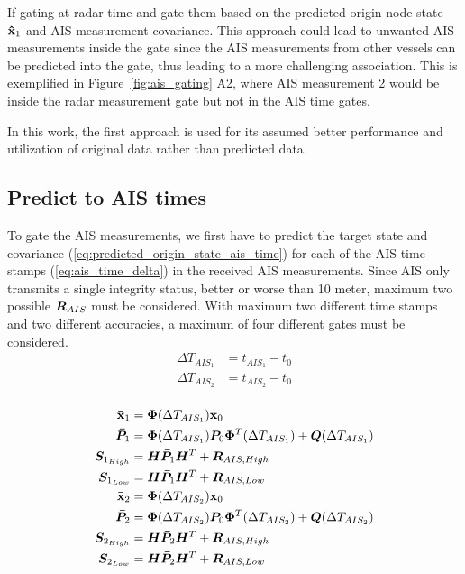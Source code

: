 If gating at radar time and gate them based on the predicted origin node state \(\boldsymbol{\mathbf{\hat{x}}}_1\) and AIS measurement covariance. This approach could lead to unwanted AIS measurements inside the gate since the AIS measurements from other vessels can be predicted into the gate, thus leading to a more challenging association. This is exemplified in Figure~\ref{fig:ais_gating} A2, where AIS measurement 2 would be inside the radar measurement gate but not in the AIS time gates.

In this work, the first approach is used for its assumed better performance and utilization of original data rather than predicted data. 

\subsection{Predict to AIS times}
To gate the AIS measurements, we first have to predict the target state and covariance (\ref{eq:predicted_origin_state_ais_time}) for each of the AIS time stamps (\ref{eq:ais_time_delta}) in the received AIS measurements. Since AIS only transmits a single integrity status, better or worse than 10 meter, maximum two possible \(\bm{R}_{AIS}\) must be considered. With maximum two different time stamps and two different accuracies, a maximum of four different gates must be considered.
\begin{equation}\label{eq:ais_time_delta}
\begin{split}
\Delta T_{AIS_1} &= t_{AIS_1} - t_{0} \\
\Delta T_{AIS_2} &= t_{AIS_2} - t_{0} \\
\end{split}
\end{equation}

\begin{equation}\label{eq:predicted_origin_state_ais_time}
\begin{split}
\boldsymbol{\mathbf{\bar{x}}}_1 	&= \bm{\Phi}(\Delta T_{AIS_1}) \boldsymbol{\mathbf{x}}_0 \\
\bm{\bar{P}}_1	&= \bm{\Phi}(\Delta T_{AIS_1}) \bm{P}_0 \bm{\Phi}^T(\Delta T_{AIS_1}) + \bm{Q}(\Delta T_{AIS_1}) \\
\bm{S}_{1_{High}}&= \bm{H} \bm{\bar{P}}_1 \bm{H}^T + \bm{R}_{AIS, High} \\
\bm{S}_{1_{Low}}	&= \bm{H} \bm{\bar{P}}_1 \bm{H}^T + \bm{R}_{AIS, Low} \\
\boldsymbol{\mathbf{\bar{x}}}_2 	&= \bm{\Phi}(\Delta T_{AIS_2}) \boldsymbol{\mathbf{x}}_0 \\
\bm{\bar{P}}_2	&= \bm{\Phi}(\Delta T_{AIS_2}) \bm{P}_0 \bm{\Phi}^T(\Delta T_{AIS_2}) + \bm{Q}(\Delta T_{AIS_2}) \\
\bm{S}_{2_{High}}&= \bm{H} \bm{\bar{P}}_2 \bm{H}^T + \bm{R}_{AIS, High} \\
\bm{S}_{2_{Low}}	&= \bm{H} \bm{\bar{P}}_2 \bm{H}^T + \bm{R}_{AIS, Low} \\
\end{split}
\end{equation}

